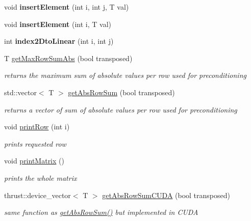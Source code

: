 \begin{DoxyCompactItemize}
\mbox{\label{classflex_full_matrix_a5e800f6cfa4dce076db573506a4ef350}} 
void {\bfseries insert\+Element} (int i, int j, T val)
\item 
\mbox{\label{classflex_full_matrix_a9cbb6fb192b366be32bb53e3850830d6}} 
void {\bfseries insert\+Element} (int i, T val)
\item 
\mbox{\label{classflex_full_matrix_a70f1a87d9e7cc34241fe0f46db0d3101}} 
int {\bfseries index2\+Dto\+Linear} (int i, int j)
\item 
T \hyperlink{classflex_full_matrix_a3ca8466b330c14b23689cb9f5507d40a}{get\+Max\+Row\+Sum\+Abs} (bool transposed)
\begin{DoxyCompactList}\small\item\em returns the maximum sum of absolute values per row used for preconditioning \end{DoxyCompactList}\item 
std\+::vector$<$ T $>$ \hyperlink{classflex_full_matrix_a911d6b2a452edb8233f56c1e5250855e}{get\+Abs\+Row\+Sum} (bool transposed)
\begin{DoxyCompactList}\small\item\em returns a vector of sum of absolute values per row used for preconditioning \end{DoxyCompactList}\item 
void \hyperlink{classflex_full_matrix_a0b9340f3b7a7559c56db7d1ce0d9d510}{print\+Row} (int i)
\begin{DoxyCompactList}\small\item\em prints requested row \end{DoxyCompactList}\item 
\mbox{\label{classflex_full_matrix_ab61b7be5bc8b511f283be8a266c85833}} 
void \hyperlink{classflex_full_matrix_ab61b7be5bc8b511f283be8a266c85833}{print\+Matrix} ()
\begin{DoxyCompactList}\small\item\em prints the whole matrix \end{DoxyCompactList}\item 
thrust\+::device\+\_\+vector$<$ T $>$ \hyperlink{classflex_full_matrix_af8ade69023e1c5140a82ad3583a8acb6}{get\+Abs\+Row\+Sum\+C\+U\+DA} (bool transposed)
\begin{DoxyCompactList}\small\item\em same function as \hyperlink{classflex_full_matrix_a911d6b2a452edb8233f56c1e5250855e}{get\+Abs\+Row\+Sum()} but implemented in C\+U\+DA \end{DoxyCompactList}\end{DoxyCompactItemize}
